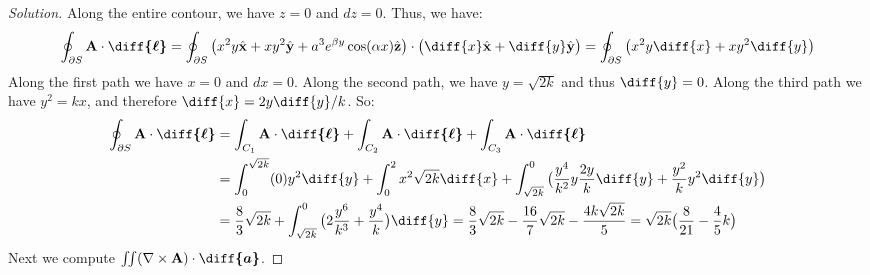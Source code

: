 \documentclass[crop=false,class=book,oneside]{standalone}
\begin{document}
            \begin{proof}[Solution]
                Along the entire contour, we have $z=0$ and $dz=0$.
                Thus, we have:
                \begin{equation*}
                    \oint_{\partial S}
                    \mathbf{A}\cdot\boldsymbol{\diff{\ell}}
                    =\oint_{\partial S}
                    \big(
                         x^{2}y\hat{\mathbf{x}}
                        +xy^{2}\hat{\mathbf{y}}
                        +a^{3}e^{\beta{y}}\cos(\alpha{x})\hat{\mathbf{z}}
                    \big)
                    \cdot\big(
                         \diff{x}\hat{\mathbf{x}}
                        +\diff{y}\hat{\mathbf{y}}
                    \big)
                    =\oint_{\partial S}
                    \big(x^{2}y\diff{x}+xy^{2}\diff{y}\big)
                \end{equation*}
                Along the first path we have $x=0$ and $dx=0$.
                Along the second path, we
                have $y=\sqrt{2k}$ and thus $\diff{y}=0$.
                Along the third path we have $y^{2}=kx$,
                and therefore $\diff{x}=2y\diff{y}/k$. So:
                \begin{align*}
                    \oint_{\partial S}
                    \mathbf{A}\cdot\boldsymbol{\diff{\ell}}
                    &=\int_{C_{1}}\mathbf{A}
                    \cdot\boldsymbol{\diff{\ell}}
                    +\int_{C_{2}}\mathbf{A}
                    \cdot\boldsymbol{\diff{\ell}}
                    +\int_{C_{3}}
                    \mathbf{A}\cdot\boldsymbol{\diff{\ell}}\\
                    &=\int_{0}^{\sqrt{2k}}(0)y^{2}\diff{y}
                     +\int_{0}^{2}x^{2}\sqrt{2k}\diff{x}
                     +\int_{\sqrt{2k}}^{0}\big(
                        \frac{y^{4}}{k^2}y\frac{2y}{k}\diff{y}
                        +\frac{y^{2}}{k}y^{2}\diff{y}
                    \big)\\
                    &=\frac{8}{3}\sqrt{2k}
                     +\int_{\sqrt{2k}}^{0}\big(2\frac{y^{6}}{k^{3}}
                     +\frac{y^{4}}{k}\big)\diff{y}
                    =\frac{8}{3}\sqrt{2k}
                    -\frac{16}{7}\sqrt{2k}
                    -\frac{4k\sqrt{2k}}{5}
                    =\sqrt{2k}\big(\frac{8}{21}-\frac{4}{5}k\big)
                \end{align*}
                Next we compute
                $\iint(\nabla\times\mathbf{A})%
                 \cdot\boldsymbol{\diff{a}}$.

\end{proof}
\end{document}
